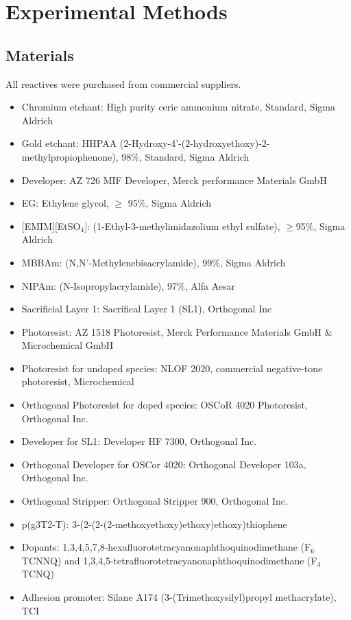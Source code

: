\chapter{Experimental Methods} \label{cha:2}

\section{Materials}
All reactives were purchased from commercial suppliers. %

\begin{itemize}
\item Chromium etchant: High purity ceric ammonium nitrate, Standard, Sigma Aldrich
\item Gold etchant:  HHPAA (2-Hydroxy-4’-(2-hydroxyethoxy)-2-methylpropiophenone), 98$\%$, Standard, Sigma Aldrich
\item Developer: AZ 726 MIF Developer, Merck performance Materials GmbH
\item EG: Ethylene glycol, $\geq$ 95$\%$, Sigma Aldrich
\item $[$EMIM$][$EtSO$_{4}]$: (1-Ethyl-3-methylimidazolium ethyl sulfate), $\geq$95$\%$, Sigma Aldrich 
\item MBBAm: (N,N’-Methylenebisacrylamide), 99$\%$, Sigma Aldrich 
\item NIPAm: (N-Isopropylacrylamide), 97$\%$, Alfa Aesar 
\item Sacrificial Layer 1: Sacrifical Layer 1 (SL1), Orthogonal Inc
\item Photoresist: AZ 1518 Photoresist, Merck Performance Materials GmbH \& Microchemical GmbH
\item Photoresist for undoped species: NLOF 2020, commercial negative-tone photoresist, Microchemical
\item Orthogonal Photoresist for doped species: OSCoR 4020 Photoresist, Orthogonal Inc.
\item Developer for SL1: Developer HF 7300, Orthogonal Inc.
\item Orthogonal Developer for OSCor 4020: Orthogonal Developer 103a, Orthogonal Inc.
\item Orthogonal Stripper: Orthogonal Stripper 900, Orthogonal Inc. 
\item p(g3T2-T): 3-(2-(2-(2-methoxyethoxy)ethoxy)ethoxy)thiophene
\item Dopants: 1,3,4,5,7,8-hexafluorotetracyanonaphthoquinodimethane (F$_{6}$TCNNQ) and 1,3,4,5-tetrafluorotetracyanonaphthoquinodimethane (F$_{4}$TCNQ)
\item Adhesion promoter: Silane A174 (3-(Trimethoxysilyl)propyl methacrylate), TCI

\end{itemize}

